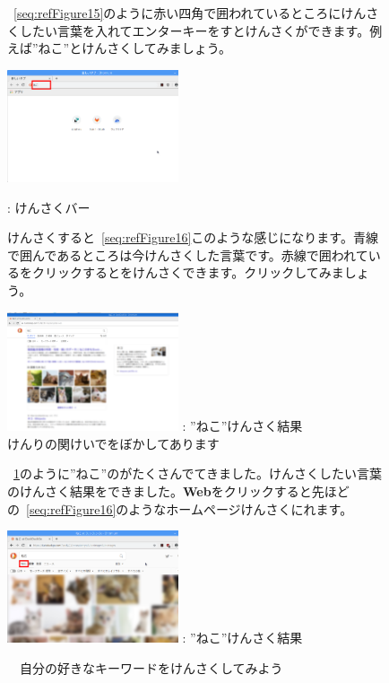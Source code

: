 \documentclass[a4paper,12pt]{jarticle}
\begin{document}
\begin{figure}
  ~\ref{seq:refFigure15}のように赤い四角で囲われているところにけんさくしたい言葉を入れてエンターキーをすとけんさくができます。例えば”ねこ”とけんさくしてみましょう。
  \centering
  {\upshape
    \includegraphics[width=0.45\textwidth]{textbook-img077.png}

    {\theFigure\label{seq:refFigure15}}: けんさくバー}


  \flushleft
  けんさくすると~\ref{seq:refFigure16}このような感じになります。青線で囲んであるところは今けんさくした言葉です。赤線で囲われている\textbf{}をクリックするとをけんさくできます。クリックしてみましょう。


  \centering
  {\upshape
    \includegraphics[width=0.45\textwidth]{textbook-img078.png}
    \newline
    {\theFigure\label{seq:refFigure16}}:
    ”ねこ”けんさく結果\\
    けんりの関けいでをぼかしてあります}

  \flushleft
  ~\ref{seq:refFigure17}のように”ねこ”のがたくさんでてきました。けんさくしたい言葉のけんさく結果をできました。\textbf{Web}をクリックすると先ほどの~\ref{seq:refFigure16}のようなホームページけんさくにれます。


  \centering
  \upshape
    \includegraphics[width=0.45\textwidth]{textbook-img079.png}
    \newline
    {\theFigure\label{seq:refFigure17}}:
    ”ねこ”けんさく結果

  \flushleft
  \theQuestion

  \ \ 自分の好きなキーワードをけんさくしてみよう

\end{figure}
\end{document}
